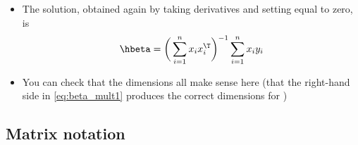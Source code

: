 \documentclass{article}
\begin{document}
\begin{itemize}
\item The solution, obtained again by taking derivatives and setting equal to
  zero, is
  \begin{equation}
  \label{eq:beta_mult1}
  \hbeta = \bigg( \sum_{i=1}^n x_i x_i^\T \bigg)^{-1} \sum_{i=1}^n x_i y_i  
  \end{equation}

\item You can check that the dimensions all make sense here (that the right-hand
  side in \eqref{eq:beta_mult1} produces the correct dimensions for
  \smash{$\hbeta$}) 
\end{itemize}

\subsection{Matrix notation}
\end{document}
